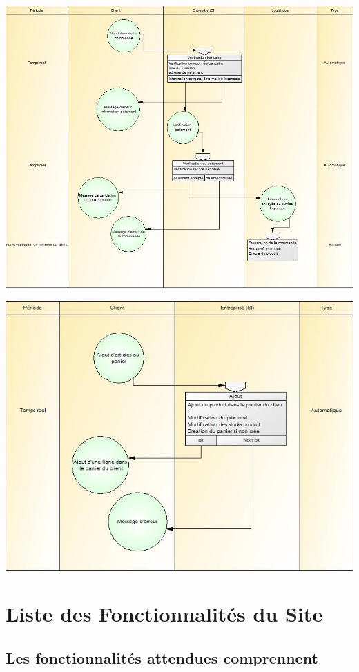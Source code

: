 \documentclass[12pt]{report}
\begin{document}
\begin{spacing}{1.2}
\centerline{\includegraphics{mot_validationCommande.jpg}}
\centerline{\includegraphics{mot_ajout.jpg}}
\chapter{Liste des Fonctionnalités du Site}

\section{Les fonctionnalités attendues comprennent}
\begin{itemize}


\end{itemize}
\end{spacing}
\end{document}
